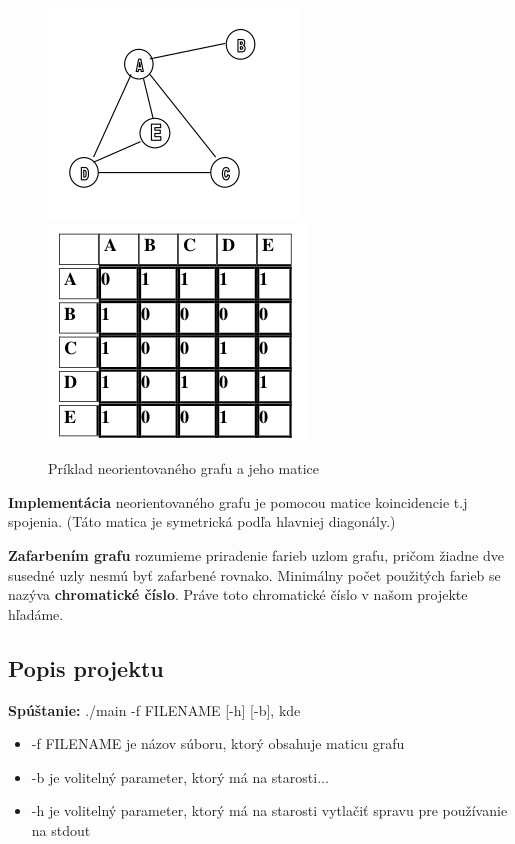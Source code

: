 \documentclass[a4paper,11pt]{article}
\begin{document}
\begin{figure}[h]
  \centering
  \includegraphics[scale=0.60]{neor_graf.png}\includegraphics[scale=0.58]{matrix_n_graf.png}
  \caption{Príklad neorientovaného grafu a jeho matice}
  \label{fig:graf}
\end{figure}

\textbf{Implementácia} neorientovaného grafu je pomocou matice koincidencie t.j spojenia. (Táto matica je symetrická podľa hlavniej diagonály.)

\textbf{Zafarbením grafu} rozumieme priradenie farieb uzlom grafu, pričom žiadne dve susedné uzly nesmú byť zafarbené rovnako. Minimálny počet použitých farieb se nazýva \textbf{chromatické číslo}. Práve toto chromatické číslo v našom projekte hľadáme.

\subsection{Popis projektu}
\textbf{Spúštanie:} ./main -f FILENAME [-h] [-b], kde
\begin{itemize}
    \item -f FILENAME je názov súboru, ktorý obsahuje maticu grafu
    \item -b je volitelný parameter, ktorý má na starosti...
    \item -h je volitelný parameter, ktorý má na starosti vytlačiť spravu pre používanie na stdout
\end{itemize}
\end{document}
